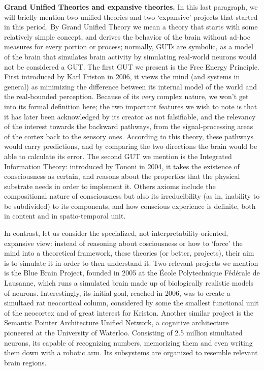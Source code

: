 \documentclass[../main.tex]{subfiles}
\begin{document}
\vspace{4pt}
\textbf{Grand Unified Theories and expansive theories.}
In this last paragraph, we will briefly mention two unified theories and two `expansive' projects that started in this period. By Grand Unified Theory we mean a theory that starts with some relatively simple concept, and derives the behavior of the brain without ad-hoc measures for every portion or process; normally, GUTs are symbolic, as a model of the brain that simulates brain activity by simulating real-world neurons would not be considered a GUT.
The first GUT we present is the Free Energy Principle. First introduced by Karl Friston in 2006\cite{fristonFreeEnergyPrinciple2006}, it views the mind (and systems in general) as minimizing the difference between its internal model of the world and the real-bounded perception. Because of its \textit{very} complex nature, we won't get into its formal definition here; the two important features we wish to note is that it has later been acknowledged by its creator as not falsifiable, and the relevancy of the interest towards the backward pathways, from the signal-processing areas of the cortex back to the sensory ones. According to this theory, these pathways would carry predictions, and by comparing the two directions the brain would be able to calculate its error.
The second GUT we mention is the Integrated Information Theory: introduced by Tononi in 2004\cite{tononiInformationIntegrationTheory2004}, it takes the existence of consciousness as certain, and reasons about the properties that the physical substrate needs in order to implement it. Others axioms include the compositional nature of consciousness but also its irreducibility (as in, inability to be subdivided) to its components, and how conscious experience is definite, both in content and in spatio-temporal unit.

In contrast, let us consider the specialized, not interpretability-oriented, expansive view: instead of reasoning about cosciousness or how to `force' the mind into a theoretical framework, these theories (or better, projects), their aim is to simulate it in order to then understand it. Two relevant projects we mention is the Blue Brain Project, founded in 2005 at the École Polytechnique Fédérale de Lausanne, which runs a  simulated brain made up of biologically realistic models of neurons. Interestingly, its initial goal, reached in 2006, was to create a simultaed rat neocortical column, considered by some the smallest functional unit of the neocortex and of great interest for Kriston. Another similar project is the Semantic Pointer Architecture Unified Network, a cognitive architecture pioneered at the University of Waterloo. Consisting of 2.5 million simultated neurons, its capable of recognizing numbers, memorizing them and even writing them down with a robotic arm. Its subsystems are organized to resemble relevant brain regions.
\end{document}
